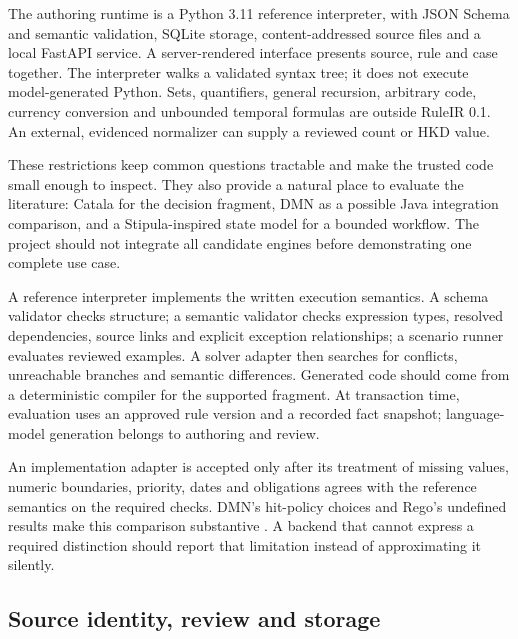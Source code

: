 The authoring runtime is a Python 3.11 reference interpreter, with JSON Schema and
semantic validation, SQLite storage, content-addressed source files and a local
FastAPI service. A server-rendered interface presents source, rule and case
together. The interpreter walks a validated syntax tree; it does not execute
model-generated Python. Sets, quantifiers, general recursion, arbitrary code,
currency conversion and unbounded temporal formulas are outside RuleIR 0.1.
An external, evidenced normalizer can supply a reviewed count or HKD value.

These restrictions keep common questions tractable and make the trusted code
small enough to inspect. They also provide a natural place to evaluate the
literature: Catala for the decision fragment, DMN as a possible Java integration comparison,
and a Stipula-inspired state model for a bounded workflow. The project should not
integrate all candidate engines before demonstrating one complete use case.


A reference interpreter implements the written execution semantics. A schema
validator checks structure; a semantic validator checks expression types,
resolved dependencies,
source links and explicit exception relationships; a scenario runner evaluates
reviewed examples. A solver adapter then searches for conflicts, unreachable
branches and semantic differences. Generated code should come from a deterministic
compiler for the supported fragment. At transaction time, evaluation uses an
approved rule version and a recorded fact snapshot; language-model generation
belongs to authoring and review.

An implementation adapter is accepted only after its treatment of missing
values, numeric boundaries, priority, dates and obligations agrees with the
reference semantics on the required checks. DMN's hit-policy choices and Rego's
undefined results make this comparison substantive
\citep{dmn2024,opadocs}. A backend that cannot express a required distinction
should report that limitation instead of approximating it silently.

\subsection{Source identity, review and storage}
\label{merge:P-03c-storage-review:00}


